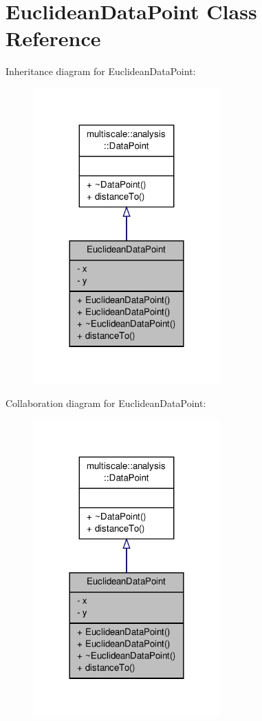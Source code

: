 \hypertarget{classEuclideanDataPoint}{\section{Euclidean\-Data\-Point Class Reference}
\label{classEuclideanDataPoint}
}


Inheritance diagram for Euclidean\-Data\-Point\-:
\nopagebreak
\begin{figure}[H]
\begin{center}
\leavevmode
\includegraphics[width=204pt]{classEuclideanDataPoint__inherit__graph}
\end{center}
\end{figure}


Collaboration diagram for Euclidean\-Data\-Point\-:
\nopagebreak
\begin{figure}[H]
\begin{center}
\leavevmode
\includegraphics[width=204pt]{classEuclideanDataPoint__coll__graph}
\end{center}
\end{figure}
